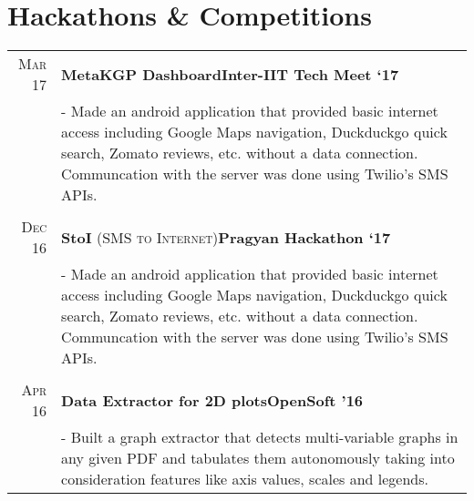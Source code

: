 \documentclass[a4paper,11pt]{extarticle} %
\begin{document}
\section{Hackathons \& Competitions}

\begin{tabular}{r|p{18cm}}

\textsc{Mar 17} & \textbf{MetaKGP Dashboard}\hfill\textbf{Inter-IIT Tech Meet `17}\\
& \footnotesize{- Made an android application that provided basic internet access including Google Maps navigation, Duckduckgo quick search, Zomato reviews, etc. without a data connection. Communcation with the server was done using Twilio's SMS APIs.}\\
\multicolumn{2}{c}{} \\

\textsc{Dec 16} & \textbf{StoI} \textsc{(SMS to Internet)}\hfill\textbf{Pragyan Hackathon `17}\\
& \footnotesize{- Made an android application that provided basic internet access including Google Maps navigation, Duckduckgo quick search, Zomato reviews, etc. without a data connection. Communcation with the server was done using Twilio's SMS APIs.}\\
\multicolumn{2}{c}{} \\

\textsc{Apr 16} & \textbf{Data Extractor for 2D plots}\hfill\textbf{OpenSoft '16}\\
& \footnotesize{- Built a graph extractor that detects multi-variable graphs in any given PDF and tabulates them autonomously taking into consideration features like axis values, scales and legends.}\\



\end{tabular}
\end{document}
